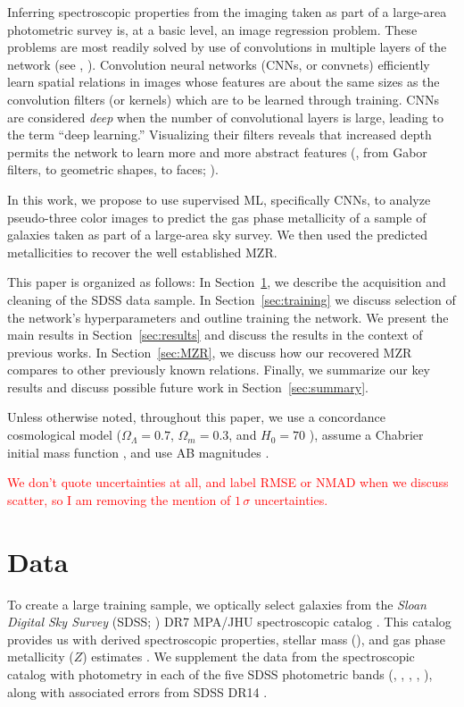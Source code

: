 \documentclass[fleqn,usenatbib]{mnras}
\newcommand{\editorial}[1]{\textcolor{red}{#1}}
\begin{document}
Inferring spectroscopic properties from the imaging taken as part of a large-area photometric survey is, at a basic level, an image regression problem. These problems are most readily solved by use of convolutions in multiple layers of the network (see \eg, \citealt{Krizhevsky2012}). Convolution neural networks (CNNs, or convnets) efficiently learn spatial relations in images whose features are about the same sizes as the convolution filters (or kernels) which are to be learned through training. CNNs are considered \textit{deep} when the number of convolutional layers is large, leading to the term ``deep learning.'' Visualizing their filters reveals that increased depth permits the network to learn more and more abstract features (\eg, from Gabor filters, to geometric shapes, to faces; \citealt{Zeiler2014}).

In this work, we propose to use supervised ML, specifically CNNs, to analyze pseudo-three color images to predict the gas phase metallicity of a sample of galaxies taken as part of a large-area sky survey. We then used the predicted metallicities to recover the well established MZR.

This paper is organized as follows: In Section~\ref{sec:data}, we describe the acquisition and cleaning of the SDSS data sample. In Section~\ref{sec:training} we discuss selection of the network's hyperparameters and outline training the network. We present the main results in Section~\ref{sec:results} and discuss the results in the context of previous works. In Section~\ref{sec:MZR}, we discuss how our recovered MZR compares to other previously known relations. Finally, we summarize our key results and discuss possible future work in Section~\ref{sec:summary}.

Unless otherwise noted, throughout this paper, we use a concordance cosmological model ($\Omega_\Lambda = 0.7$, $\Omega_m = 0.3$, and $H_0= 70$ \kms \permpc), assume a Chabrier initial mass function \citep{Chabrier2003}, and use AB magnitudes \citep{Oke1974}. 

\editorial{We don't quote uncertainties at all, and label RMSE or NMAD when we discuss scatter, so I am removing the mention of $1\,\sigma$ uncertainties.}

\section{Data} \label{sec:data}
To create a large training sample, we optically select galaxies from the \textit{Sloan Digital Sky Survey} (SDSS; \citealt{York2000}) DR7 MPA/JHU spectroscopic catalog \citep{Kauffmann2003a, Brinchmann2004, Salim2007}. This catalog provides us with derived spectroscopic properties, stellar mass (\mstar), and gas phase metallicity ($Z$) estimates \citep{Tremonti2004}. We supplement the data from the spectroscopic catalog with photometry in each of the five SDSS photometric bands (\sdssu, \sdssg, \sdssr, \sdssi, \sdssz), along with associated errors from SDSS DR14 \citep{Abolfathi2017}.
\end{document}
